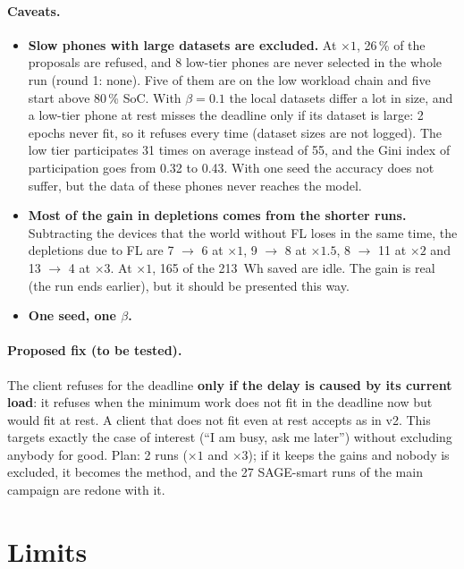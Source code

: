\documentclass[11pt,a4paper]{article}
\begin{document}
\paragraph{Caveats.}
\begin{itemize}
  \item \textbf{Slow phones with large datasets are excluded.} At $\times1$,
        26\,\% of the proposals are refused, and 8 low-tier phones are never
        selected in the whole run (round 1: none). Five of them are on the low workload
        chain and five start above 80\,\% SoC. With $\beta=0.1$ the local
        datasets differ a lot in size, and a low-tier phone at rest misses the
        deadline only if its dataset is large: 2 epochs never fit, so it refuses
        every time (dataset sizes are not logged). The low tier participates 31 times on average instead
        of 55, and the Gini index of participation goes from 0.32 to 0.43. With
        one seed the accuracy does not suffer, but the data of these phones never
        reaches the model.
  \item \textbf{Most of the gain in depletions comes from the shorter runs.}
        Subtracting the devices that the world without FL loses in the same time,
        the depletions due to FL are 7 $\to$ 6 at $\times1$, 9 $\to$ 8 at
        $\times1.5$, 8 $\to$ 11 at $\times2$ and 13 $\to$ 4 at $\times3$. At
        $\times1$, 165 of the 213~Wh saved are idle. The gain is real (the run
        ends earlier), but it should be presented this way.
  \item \textbf{One seed, one $\beta$.}
\end{itemize}

\paragraph{Proposed fix (to be tested).} The client refuses for the deadline
\textbf{only if the delay is caused by its current load}: it refuses when the
minimum work does not fit in the deadline now but would fit at rest. A client
that does not fit even at rest accepts as in v2. This targets exactly the case
of interest (``I am busy, ask me later'') without excluding anybody for good.
Plan: 2 runs ($\times1$ and $\times3$); if it keeps the gains and nobody is
excluded, it becomes the method, and the 27 SAGE-smart runs of the main
campaign are redone with it.

\section{Limits}
\end{document}
